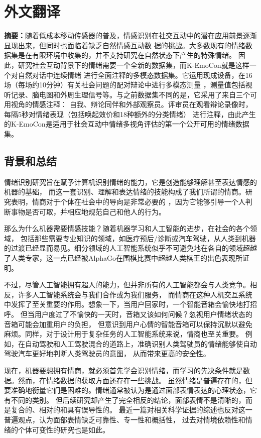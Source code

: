 \cleardoublepage
\chapter{外文翻译}

\textbf{摘要：}随着低成本移动传感器的普及，情感识别在社交互动中的潜在应用前景逐渐显现出来，但同时也面临着缺乏自然情感互动数
据的挑战。大多数现有的情绪数据集是在有限环境中收集的，并不支持研究在自然状态下产生的特殊情绪。
因此，研究社会互动背景下的情绪需要一个全新的数据集，而K-EmoCon就是这样一个对自然对话中连续情绪
进行全面注释的多模态数据集。它运用现成设备，在16场（每场约10分钟）有关社会问题的配对辩论中进行多模态测量
，测量值包括视听记录、脑电图和外周生理信号等。与之前数据集不同的是，它采用了来自三个可用视角的情感注释：
自我、辩论同伴和外部观察员。评审员在观看辩论录像时，每隔5秒对情绪表现（包括唤起效价和18种额外的分类情绪）
进行注释，由此产生的K-EmoCon是适用于社会互动中情绪多视角评估的第一个公开可用的情绪数据集。

\section{背景和总结}
情绪识别研究旨在赋予计算机识别情绪的能力，它是创造能够理解甚至表达情感的机器的基础，
而这一套识别、理解和表达情绪的技能构成了我们所谓的情商。研究表明，情商对于个体在社会中的导向是非常必要的
，因为它能够引导一个人判断事物是否可取，并相应地规范自己和他人的行为。

那么为什么机器需要情感技能？随着机器学习和人工智能的进步，在社会的各个领域，
包括那些需要专业知识的领域，如医疗预后/诊断或汽车驾驶，从人类到机器的过渡已经显而易见。细分领域的人工智能系统似乎不可避免地在各自的领域超越了人类专家，这一点已经被AlphaGo在围棋比赛中超越人类棋王的出色表现所证明。

\raggedbottom
不过，尽管人工智能拥有超人的能力，但并非所有的人工智能都会与人类竞争。相反，许多人工智能系统会与我们合作或为我们服务，
而情商在这种人机交互系统中发挥了至关重要的作用。想象一下，当用户回家时，一个智能音箱会愉快地打招呼。
但当用户度过了不愉快的一天时，音箱又该如何问候？忽视用户情绪状态的音箱可能会加重用户的负担，
但意识到用户心情的智能音箱可以保持沉默以避免麻烦。同样，对于设计用于复杂任务的人工智能系统来说，情商也至关重要。
例如，在自动驾驶和人工驾驶混合的道路上，准确识别人类驾驶员的情绪能够使自动驾驶汽车更好地判断人类驾驶员的意图，
从而带来更高的安全性。

现在，机器要想拥有情商，就必须首先学会识别情绪，而学习的先决条件就是数据。然而，在情绪数据的获取方面还存在一些挑战。
虽然情绪是普遍存在的，但要准确地衡量它们是困难的。情绪通常被认为是通过面部表情表达的心理状态，它有不同的类别。
但后续研究却产生了完全相反的结论，面部表情不是清晰的，而是复合的、相对的和具有误导性的。
最近一篇对相关科学证据的综述也反对这一普遍观点，认为面部表情缺乏可靠性、专一性和概括性，
过去对情境依赖性和情绪的个体可变性的研究也是如此。


